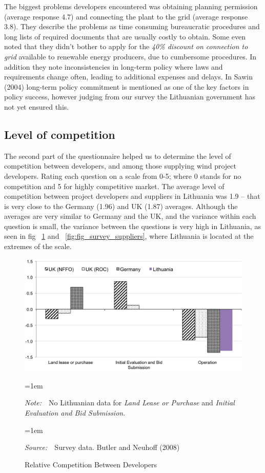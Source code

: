 \documentclass[a4paper, 12pt]{article}
\newcommand{\Figtext}[1]{%
	\begin{tablenotes}[para,flushleft]
		\hangindent=1em
		\footnotesize
		\raggedright
		#1
	\end{tablenotes}
}
\newcommand{\Fignote}[1]{\Figtext{\emph{Note:~}~#1}}
\newcommand{\Figsource}[1]{\Figtext{\emph{Source:~}~#1}}
\begin{document}
The biggest problems developers encountered was obtaining planning permission (average response 4.7) and connecting the plant to the grid (average response 3.8). They describe the problems as time consuming bureaucratic procedures and long lists of required documents that are usually costly to obtain. Some even noted that they didn’t bother to apply for the \emph{40\% discount on connection to grid} available to renewable energy producers, due to cumbersome procedures. In addition they note inconsistencies in long-term policy where laws and requirements change often, leading to additional expenses and delays. In Sawin (2004) long-term policy commitment is mentioned as one of the key factors in policy success, however judging from our survey the Lithuanian government has not yet ensured this.

\subsection{Level of competition}
The second part of the questionnaire helped us to determine the level of competition between developers, and among those supplying wind project developers. Rating each question on a scale from 0-5; where 0 stands for no competition and 5 for highly competitive market. The average level of competition between project developers and suppliers in Lithuania was 1.9 – that is very close to the Germany (1.96) and UK (1.87) averages. Although the averages are very similar to Germany and the UK, and the variance within each question is small, the variance between the questions is very high in Lithuania, as seen in fig ~\ref{fig:fig_survey_competition} and ~\ref{fig:fig_survey_suppliers}, where Lithuania is located at the extremes of the scale.

\begin{figure}
	\centering
	\caption{Relative Competition Between Developers}
	\includegraphics[width=1\textwidth]{fig_survey_competition}
	\Fignote{No Lithuanian data for \emph{Land Lease or Purchase} and \emph{Initial Evaluation and Bid Submission}.}
	\Figsource{Survey data. Butler and Neuhoff (2008)}
	\label{fig:fig_survey_competition}
\end{figure}
\end{document}
